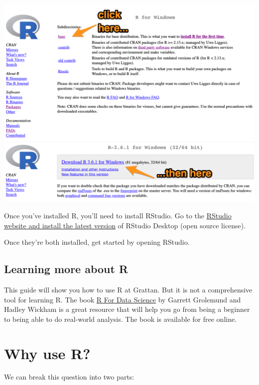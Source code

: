 \documentclass[]{book}
\begin{document}
\includegraphics[width=15.69in]{atlas/r_cran_windows_1}
\includegraphics[width=15.67in]{atlas/r_cran_windows_2}

Once you've installed R, you'll need to install RStudio. Go to the \href{https://www.rstudio.com/products/rstudio/download/\#download}{RStudio website and install the latest version} of RStudio Desktop (open source license).

Once they're both installed, get started by opening RStudio.

\hypertarget{learning-more-about-r}{%
\section{Learning more about R}\label{learning-more-about-r}}

This guide will show you how to use R at Grattan. But it is not a comprehensive tool for learning R. The book \href{https://r4ds.had.co.nz}{R For Data Science} by Garrett Grolemund and Hadley Wickham is a great resource that will help you go from being a beginner to being able to do real-world analysis. The book is available for free online.

\hypertarget{why-use-r}{%
\chapter{Why use R?}\label{why-use-r}}

We can break this question into two parts:
\end{document}
